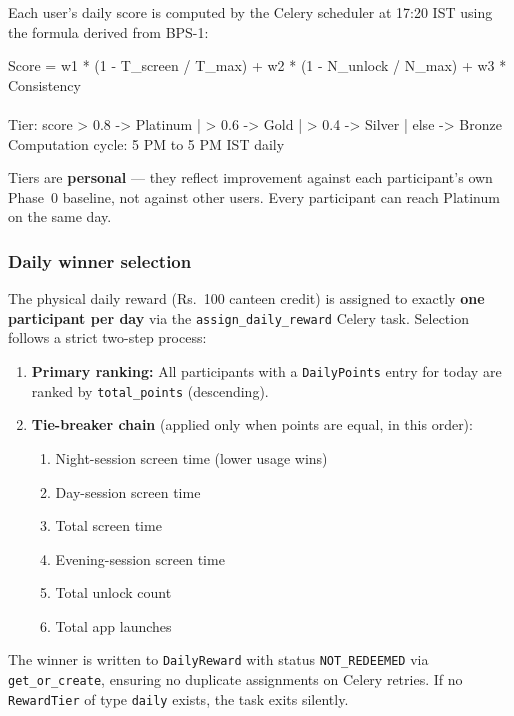 \documentclass[12pt, a4paper]{article}
\begin{document}
Each user's daily score is computed by the Celery scheduler at 17:20 IST using the
formula derived from BPS-1:

\begin{formulabox}
Score = w1 * (1 - T\_screen / T\_max)  +  w2 * (1 - N\_unlock / N\_max)  +  w3 * Consistency\\
\\
Tier: score > 0.8 -> Platinum  |  > 0.6 -> Gold  |  > 0.4 -> Silver  |  else -> Bronze\\
Computation cycle: 5 PM to 5 PM IST daily
\end{formulabox}

Tiers are \textbf{personal} --- they reflect improvement against each participant's own
Phase~0 baseline, not against other users. Every participant can reach Platinum on
the same day.

\subsubsection*{Daily winner selection}

The physical daily reward (Rs.~100 canteen credit) is assigned to exactly
\textbf{one participant per day} via the \texttt{assign\_daily\_reward} Celery task.
Selection follows a strict two-step process:

\begin{enumerate}
  \item \textbf{Primary ranking:} All participants with a \texttt{DailyPoints} entry
  for today are ranked by \texttt{total\_points} (descending).

  \item \textbf{Tie-breaker chain} (applied only when points are equal, in this order):
  \begin{enumerate}[label=\roman*.]
    \item Night-session screen time (lower usage wins)
    \item Day-session screen time
    \item Total screen time
    \item Evening-session screen time
    \item Total unlock count
    \item Total app launches
  \end{enumerate}
\end{enumerate}

The winner is written to \texttt{DailyReward} with status \texttt{NOT\_REDEEMED} via
\texttt{get\_or\_create}, ensuring no duplicate assignments on Celery retries. If no
\texttt{RewardTier} of type \texttt{daily} exists, the task exits silently.
\end{document}

